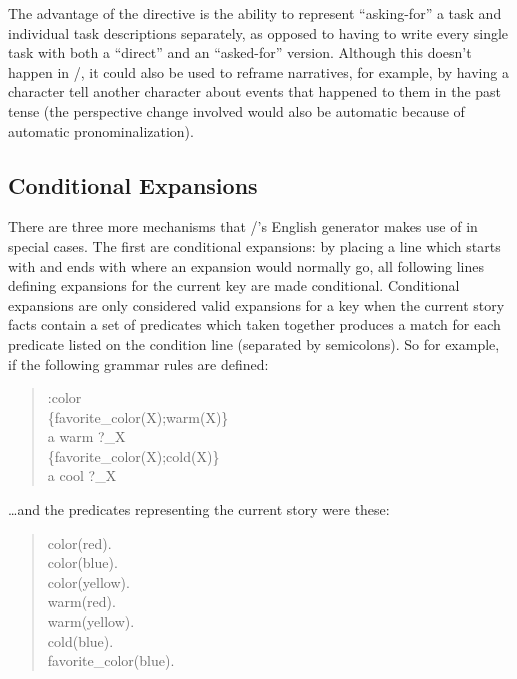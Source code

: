 The advantage of the  directive is the ability to represent ``asking-for'' a task and individual task descriptions separately, as opposed to having to write every single task with both a ``direct'' and an ``asked-for'' version.
%
Although this doesn't happen in \dunyazad/, it could also be used to reframe narratives, for example, by having a character tell another character about events that happened to them in the past tense (the perspective change involved would also be automatic because of automatic pronominalization). 


\subsection{Conditional Expansions}

There are three more mechanisms that \dunyazad/'s English generator makes use of in special cases.
%
The first are conditional expansions: by placing a line which starts with \exchar{\{} and ends with \exchar{\}} where an expansion would normally go, all following lines defining expansions for the current key are made conditional.
%
Conditional expansions are only considered valid expansions for a key when the current story facts contain a set of predicates which taken together produces a match for each predicate listed on the condition line (separated by semicolons).
%
So for example, if the following grammar rules are defined:

\begin{quote}
  \ttfamily
  :color \\
  \{favorite\_color(X);warm(X)\} \\
  a warm ?\_X \\
  \{favorite\_color(X);cold(X)\} \\
  a cool ?\_X
\end{quote}

\ldots and the predicates representing the current story were these:

\begin{quote}
  \ttfamily
  color(red). \\
  color(blue). \\
  color(yellow). \\
  warm(red). \\
  warm(yellow). \\
  cold(blue). \\
  favorite\_color(blue).
\end{quote}

